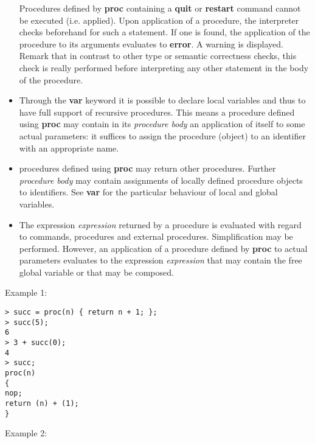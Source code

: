 \begin{itemize}
   Procedures defined by \textbf{proc} containing a \textbf{quit} or \textbf{restart} command
   cannot be executed (i.e. applied). Upon application of a procedure,
   the \sollya interpreter checks beforehand for such a statement. If one
   is found, the application of the procedure to its arguments evaluates
   to \textbf{error}. A warning is displayed. Remark that in contrast to other
   type or semantic correctness checks, this check is really performed
   before interpreting any other statement in the body of the procedure.

\item Through the \textbf{var} keyword it is possible to declare local
   variables and thus to have full support of recursive procedures. This
   means a procedure defined using \textbf{proc} may contain in its \emph{procedure body} 
   an application of itself to some actual parameters: it suffices
   to assign the procedure (object) to an identifier with an appropriate
   name.

\item \sollya procedures defined using \textbf{proc} may return other
   procedures. Further \emph{procedure body} may contain assignments of
   locally defined procedure objects to identifiers. See \textbf{var} for the
   particular behaviour of local and global variables.

\item The expression \emph{expression} returned by a procedure is evaluated with
   regard to \sollya commands, procedures and external
   procedures. Simplification may be performed.  However, an application
   of a procedure defined by \textbf{proc} to actual parameters evaluates to the
   expression \emph{expression} that may contain the free global variable or
   that may be composed.
\end{itemize}
\noindent Example 1: 
\begin{center}\begin{minipage}{15cm}\begin{Verbatim}[frame=single,commandchars=\\\|\~]
> succ = proc(n) { return n + 1; };
> succ(5);
6
> 3 + succ(0);
4
> succ;
proc(n)
{
nop;
return (n) + (1);
}
\end{Verbatim}
\end{minipage}\end{center}
\noindent Example 2: 

